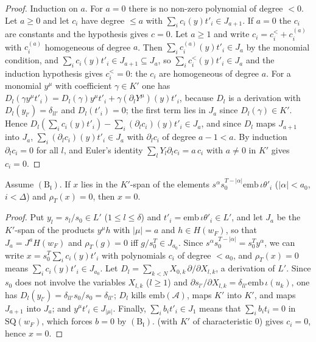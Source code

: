 \begin{proof}
Induction on $a$. For $a=0$ there is no non-zero polynomial of degree $<0$. Let $a\ge0$ and let $c_i$ have degree $\le a$
with $\sum_ic_i(y)t'_i\in J_{a+1}$. If $a=0$ the $c_i$ are constants and the hypothesis gives $c=0$. Let $a\ge1$ and write
$c_i=c_i^{<}+c_i^{(a)}$ with $c_i^{(a)}$ homogeneous of degree $a$. Then $\sum_ic_i^{(a)}(y)t'_i\in J_a$ by the monomial
condition, and $\sum_ic_i(y)t'_i\in J_{a+1}\subseteq J_a$, so $\sum_ic_i^{<}(y)t'_i\in J_a$ and the induction hypothesis
gives $c_i^<=0$: the $c_i$ are homogeneous of degree $a$. For a monomial $y^\mu$ with coefficient $\gamma\in K'$ one has
$D_l(\gamma y^\mu t'_i)=D_l(\gamma)y^\mu t'_i+\gamma(\partial_l Y^\mu)(y)t'_i$, because $D_l$ is a derivation with $D_l(y_{l'})
=\delta_{ll'}$ and $D_l(t'_i)=0$; the first term lies in $J_a$ since $D_l(\gamma)\in K'$. Hence
$D_l(\sum_ic_i(y)t'_i)-\sum_i(\partial_lc_i)(y)t'_i\in J_a$, and since $D_l$ maps $J_{a+1}$ into $J_a$,
$\sum_i(\partial_lc_i)(y)t'_i\in J_a$ with $\partial_lc_i$ of degree $a-1<a$. By induction $\partial_lc_i=0$ for all $l$, and
Euler's identity $\sum_lY_l\partial_lc_i=a\,c_i$ with $a\ne0$ in $K'$ gives $c_i=0$.
\end{proof}

\begin{lemma}\label{pf:onto1:in64}
Assume $(\mathrm B_{\mathfrak l})$. If $x$ lies in the $K'$-span of the elements $s^\alpha s_0^{T-|\alpha|}\mathrm{emb}\,\iota\theta'_i$
($|\alpha|<a_0$, $i<\Delta$) and $\rho_T(x)=0$, then $x=0$.
\end{lemma}

\begin{proof}
Put $y_l=s_l/s_0\in L'$ ($1\le l\le\delta$) and $t'_i=\mathrm{emb}\,\iota\theta'_i\in L'$, and let $J_a$ be the $K'$-span of the
products $y^\mu h$ with $|\mu|=a$ and $h\in H(w_F)$, so that $J_a=J^aH(w_F)$ and $\rho_T(g)=0$ iff $g/s_0^T\in J_{a_0}$. Since
$s^\alpha s_0^{T-|\alpha|}=s_0^Ty^\alpha$, we can write $x=s_0^T\sum_ic_i(y)t'_i$ with polynomials $c_i$ of degree $<a_0$, and
$\rho_T(x)=0$ means $\sum_ic_i(y)t'_i\in J_{a_0}$. Let $D_l=\sum_{k<N}X_{0,k}\,\partial/\partial X_{l,k}$, a derivation of $L'$. Since
$s_0$ does not involve the variables $X_{l,k}$ ($l\ge1$) and $\partial s_{l'}/\partial X_{l,k}=\delta_{ll'}\mathrm{emb}\,\iota(u_k)$, one
has $D_l(y_{l'})=\delta_{ll'}s_0/s_0=\delta_{ll'}$; $D_l$ kills $\mathrm{emb}(\mathcal A)$, maps $K'$ into $K'$, and maps $J_{a+1}$
into $J_a$; and $y^\mu t'_i\in J_{|\mu|}$. Finally, $\sum_ib_it'_i\in J_1$ means that $\sum_ib_it_i=0$ in $\mathrm{SQ}(w_F)$,
which forces $b=0$ by $(\mathrm B_{\mathfrak l})$.  (with $K'$ of characteristic $0$) gives $c_i=0$,
hence $x=0$.
\end{proof}

